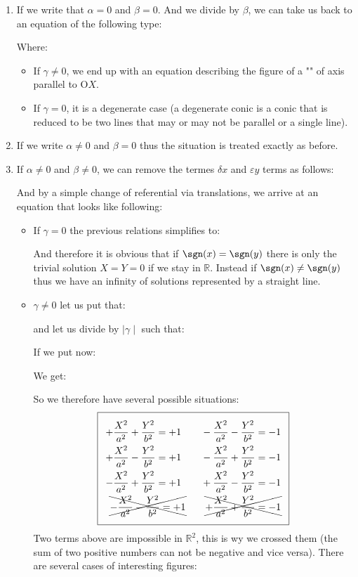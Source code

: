 	\begin{enumerate}
		\item If we write that $\alpha=0$ and  $\beta=0$. And we divide by $\beta$, we can take us back to an equation of the following type:
		
	Where:
		\begin{itemize}
			\item If $\gamma\neq 0$, we end up with an equation describing the figure of a "" of axis parallel to $\text{O}X$.
			\item If $\gamma = 0$, it is a degenerate case (a degenerate conic is a conic that is reduced to be two lines that may or may not be parallel or a single line).
		\end{itemize}
	\item If we write $\alpha \neq 0$ and $\beta = 0$ thus the situation is treated exactly as before.
	
	\item If $\alpha \neq 0$ and  $\beta \neq 0$, we can remove the termes $\delta x$ and $\varepsilon y$ terms as follows:
	
	
	And by a simple change of referential via translations, we arrive at an equation that looks like following:
		
		\begin{itemize}
			\item If $\gamma=0$ the previous relations simplifies to:
				
				And therefore it is obvious that if $\sgn(x)=\sgn(y)$ there is only the trivial solution $X=Y=0$ if we stay in $\mathbb{R}$. Instead if $\sgn(x) \neq \sgn(y)$ thus we have an infinity of solutions represented by a straight line.
			\item $\gamma \neq 0$ let us put that:
				
			and let us divide by $\mid \gamma \mid$ such that:
				
			If we put now:
			
			We get:
			
			So we therefore have several possible situations:
			\begin{equation}
			  \addtolength{\fboxsep}{5pt}
			   \boxed{
			   \begin{gathered}
				\begin{aligned}
				+\dfrac{X^2}{a^2}+\dfrac{Y^2}{b^2}=+1 \qquad -\dfrac{X^2}{a^2}-\dfrac{Y^2}{b^2}=-1\\
				+\dfrac{X^2}{a^2}-\dfrac{Y^2}{b^2}=+1 \qquad -\dfrac{X^2}{a^2}+\dfrac{Y^2}{b^2}=-1\\
				-\dfrac{X^2}{a^2}+\dfrac{Y^2}{b^2}=+1 \qquad +\dfrac{X^2}{a^2}-\dfrac{Y^2}{b^2}=-1\\
				\xcancel{-\dfrac{X^2}{a^2}-\dfrac{Y^2}{b^2}=+1} \qquad \xcancel{+\dfrac{X^2}{a^2}+\dfrac{Y^2}{b^2}=-1}\\
				\end{aligned}
			   \end{gathered}
			   }
			\end{equation}
			Two terms above are impossible in $\mathbb{R}^2$, this is wy we crossed them (the sum of two positive numbers can not be negative and vice versa).
			There are several cases of interesting figures:
			

\end{itemize}
\end{enumerate}
